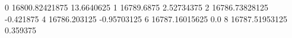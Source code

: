 0 16800.82421875 13.6640625
1 16789.6875 2.52734375
2 16786.73828125 -0.421875
4 16786.203125 -0.95703125
6 16787.16015625 0.0
8 16787.51953125 0.359375
